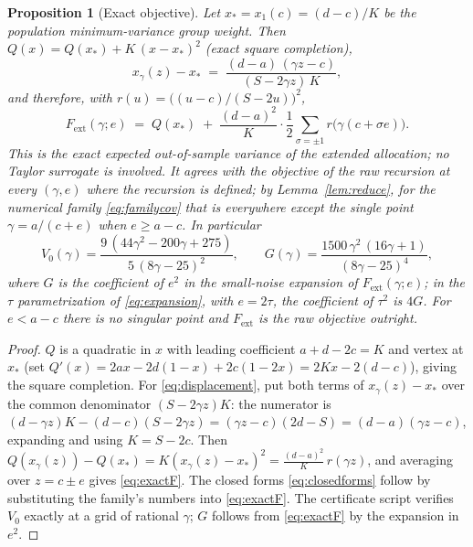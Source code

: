 \documentclass[11pt]{article}
\newtheorem{proposition}{Proposition}
\theoremstyle{remark}
\begin{document}
\begin{proposition}[Exact objective]
\label{prop:exactobj}
Let $x_* = x_1(c) = (d-c)/K$ be the population minimum-variance group
weight. Then $Q(x) = Q(x_*) + K\,(x - x_*)^2$ (exact square completion),
\begin{equation}
  x_\gamma(z) - x_* \;=\; \frac{(d-a)\,(\gamma z - c)}{(S - 2\gamma z)\,K},
  \label{eq:displacement}
\end{equation}
and therefore, with $r(u) = \big((u - c)/(S - 2u)\big)^2$,
\begin{equation}
  F_{\mathrm{ext}}(\gamma; e)
  \;=\; Q(x_*) \;+\; \frac{(d-a)^2}{K}\cdot
        \frac12 \sum_{\sigma = \pm 1} r\big(\gamma (c + \sigma e)\big).
  \label{eq:exactF}
\end{equation}
This is the exact expected out-of-sample variance of the extended
allocation; no Taylor surrogate is involved. It agrees with the objective
of the raw recursion at every $(\gamma, e)$ where the recursion is
defined; by Lemma~\ref{lem:reduce}, for the numerical family
\eqref{eq:familycov} that is everywhere except the single point
$\gamma = a/(c+e)$ when $e \ge a - c$. In
particular
\begin{equation}
  V_0(\gamma) = \frac{9\,(44\gamma^2 - 200\gamma + 275)}
  {5\,(8\gamma - 25)^2},
  \qquad
  G(\gamma) = \frac{1500\,\gamma^2\,(16\gamma + 1)}{(8\gamma - 25)^4},
  \label{eq:closedforms}
\end{equation}
where $G$ is the coefficient of $e^2$ in the small-noise expansion of
$F_{\mathrm{ext}}(\gamma; e)$; in the $\tau$ parametrization of
\eqref{eq:expansion}, with $e = 2\tau$, the coefficient of $\tau^2$ is
$4G$. For $e < a - c$ there is no singular point
and $F_{\mathrm{ext}}$ is the raw objective outright.
\end{proposition}
\begin{proof}
$Q$ is a quadratic in $x$ with leading coefficient $a + d - 2c = K$ and
vertex at $x_*$ (set $Q'(x) = 2ax - 2d(1-x) + 2c(1-2x) = 2K x - 2(d-c)$),
giving the square completion. For \eqref{eq:displacement}, put both terms of
$x_\gamma(z) - x_*$ over the common denominator $(S - 2\gamma z)K$:
the numerator is $(d - \gamma z)K - (d - c)(S - 2\gamma z)
= (\gamma z - c)(2d - S) = (d - a)(\gamma z - c)$, expanding and using
$K = S - 2c$. Then
$Q(x_\gamma(z)) - Q(x_*) = K (x_\gamma(z) - x_*)^2 =
\tfrac{(d-a)^2}{K}\, r(\gamma z)$, and averaging over
$z = c \pm e$ gives \eqref{eq:exactF}. The closed forms
\eqref{eq:closedforms} follow by substituting the family's numbers into
\eqref{eq:exactF}. The certificate script verifies $V_0$ exactly at a
grid of rational $\gamma$; $G$ follows from \eqref{eq:exactF} by the
expansion in $e^2$.
\end{proof}
\end{document}
